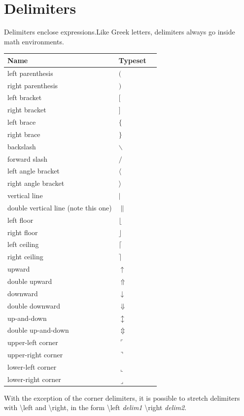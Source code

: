 \documentclass{sample}
\begin{document}
\section{Delimiters}
Delimiters enclose expressions.Like Greek letters, delimiters always go inside math environments.
\begin{center}
	\begin{tabular}{llc}
	\toprule
	Name & Typeset \\
	\midrule
	left parenthesis & $($\\
	right parenthesis & $)$\\
	left bracket & $[$\\
	right bracket & $]$\\
	left brace & $\{$\\
	right brace & $\}$\\
	backslash & $\backslash$\\
	forward slash & $/$\\
	left angle bracket & $\langle$\\
	right angle bracket & $\rangle$\\
	vertical line & $|$\\
	double vertical line (note this one) & $\|$\\
	left floor & $\lfloor$\\
	right floor & $\rfloor$\\
	left ceiling & $\lceil$\\
	right ceiling & $\rceil$\\
	upward & $\uparrow$\\
	double upward & $\Uparrow$\\
	downward & $\downarrow$\\
	double downward & $\Downarrow$\\
	up-and-down & $\updownarrow$\\
	double up-and-down & $\Updownarrow$\\
	upper-left corner & $\ulcorner$\\
	upper-right corner & $\urcorner$\\
	lower-left corner & $\llcorner$\\
	lower-right corner & $\lrcorner$\\
	\bottomrule
	\end{tabular}
	\label{Ta:delimiters}
\end{center}
With the exception of the corner delimiters, it is possible to stretch delimiters with \textbackslash left and \textbackslash right, in the form \textbackslash left \textit{delim1} \textbackslash right \textit{delim2}.
\end{document}
